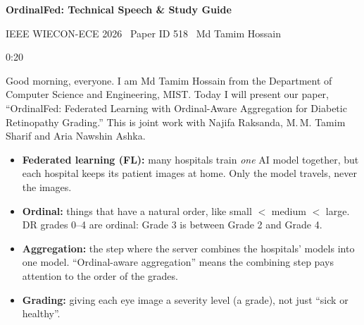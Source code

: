 \documentclass[11pt,a4paper]{article}
\newcommand{\slide}[3]{%
  \par\needspace{7\baselineskip}\bigskip\noindent{\color{accent}\large\bfseries Slide #1 \textperiodcentered\ #2}%
  \hfill{\color{muted}\small #3}\par\smallskip}
\newenvironment{terms}{%
  \par\smallskip\noindent{\color{accent}\small\bfseries TERMS ON THIS SLIDE}\par
  \begin{itemize}[leftmargin=1.2em,itemsep=2pt,topsep=2pt,label={\color{accent}\textbullet}]\small}%
  {\end{itemize}}
\newcommand{\term}[1]{\textbf{#1:}}
\begin{document}
{\color{navy}\LARGE\bfseries OrdinalFed: Technical Speech \& Study Guide}\par\smallskip
{\color{muted}IEEE WIECON-ECE 2026 \textperiodcentered\ Paper ID 518 \textperiodcentered\ Md Tamim Hossain}

\medskip
{}

\slide{1}{Title}{0:20}
Good morning, everyone. I am Md Tamim Hossain from the Department of Computer Science and
Engineering, MIST. Today I will present our paper, ``OrdinalFed: Federated Learning with
Ordinal-Aware Aggregation for Diabetic Retinopathy Grading.'' This is joint work with Najifa
Raksanda, M.\,M. Tamim Sharif and Aria Nawshin Ashka.
\begin{terms}
\item \term{Federated learning (FL)} many hospitals train \emph{one} AI model together, but each
hospital keeps its patient images at home. Only the model travels, never the images.
\item \term{Ordinal} things that have a natural order, like small $<$ medium $<$ large. DR grades
0--4 are ordinal: Grade 3 is between Grade 2 and Grade 4.
\item \term{Aggregation} the step where the server combines the hospitals' models into one model.
``Ordinal-aware aggregation'' means the combining step pays attention to the order of the grades.
\item \term{Grading} giving each eye image a severity level (a grade), not just ``sick or healthy''.
\end{terms}
\end{document}
